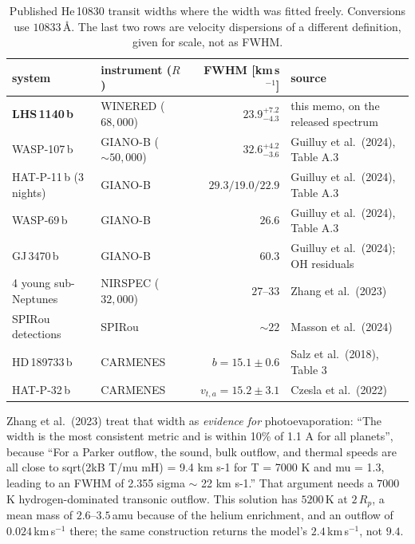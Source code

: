 \documentclass[english,a4paper]{my_memo}
\begin{document}
\begin{table}[htbp]\centering
\caption{Published He\,10830 transit widths where the width was fitted
freely. Conversions use $10833$\,\AA. The last two rows are velocity
dispersions of a different definition, given for scale, not as FWHM.}
\label{tab:widthcensus}
\begin{tabular}{llrl}
\toprule
system & instrument ($R$) & FWHM [km\,s$^{-1}$] & source \\
\midrule
\textbf{LHS\,1140\,b}   & WINERED ($68{,}000$)  & $\mathbf{23.9^{+7.2}_{-4.3}}$ & this memo, on the released spectrum \\
WASP-107\,b             & GIANO-B ($\sim 50{,}000$) & $32.6^{+4.2}_{-3.6}$ & Guilluy et al.\ (2024), Table A.3 \\
HAT-P-11\,b (3 nights)  & GIANO-B               & $29.3 / 19.0 / 22.9$ & Guilluy et al.\ (2024), Table A.3 \\
WASP-69\,b              & GIANO-B               & $26.6$               & Guilluy et al.\ (2024), Table A.3 \\
GJ\,3470\,b             & GIANO-B               & $60.3$               & Guilluy et al.\ (2024); OH residuals \\
4 young sub-Neptunes    & NIRSPEC ($32{,}000$)  & $27$--$33$           & Zhang et al.\ (2023) \\
SPIRou detections       & SPIRou                & $\sim 22$            & Masson et al.\ (2024) \\
\midrule
HD\,189733\,b           & CARMENES              & $b = 15.1 \pm 0.6$   & Salz et al.\ (2018), Table 3 \\
HAT-P-32\,b             & CARMENES              & $v_{t,a} = 15.2 \pm 3.1$ & Czesla et al.\ (2022) \\
\bottomrule
\end{tabular}
\end{table}

Zhang et al.\ (2023) treat that width as \emph{evidence for}
photoevaporation: ``The width is the most consistent metric and is within 10\%
of 1.1 A for all planets'', because ``For a Parker outflow, the sound, bulk
outflow, and thermal speeds are all close to sqrt(2kB T/mu mH) = 9.4 km s-1
for T = 7000 K and mu = 1.3, leading to an FWHM of 2.355 sigma $\sim$ 22 km
s-1.'' That argument needs a $7000$\,K hydrogen-dominated transonic outflow.
This solution has $5200$\,K at $2\,R_p$, a mean mass of $2.6$--$3.5$\,amu
because of the helium enrichment, and an outflow of $0.024$\,km\,s$^{-1}$
there; the same construction returns the model's $2.4$\,km\,s$^{-1}$, not
$9.4$.
\end{document}
